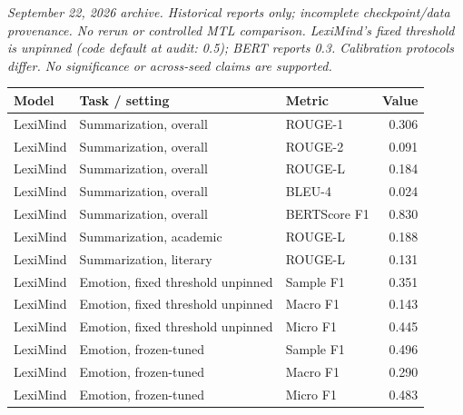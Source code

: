 \noindent\textit{September 22, 2026 archive. Historical reports only; incomplete checkpoint/data provenance. No rerun or controlled MTL comparison. LexiMind's fixed threshold is unpinned (code default at audit: 0.5); BERT reports 0.3. Calibration protocols differ. No significance or across-seed claims are supported.}\par
\begin{longtable}{p{2.4cm}p{4.5cm}p{2.3cm}r}
Model & Task / setting & Metric & Value \\
\hline
LexiMind & Summarization, overall & ROUGE-1 & 0.306 \\
LexiMind & Summarization, overall & ROUGE-2 & 0.091 \\
LexiMind & Summarization, overall & ROUGE-L & 0.184 \\
LexiMind & Summarization, overall & BLEU-4 & 0.024 \\
LexiMind & Summarization, overall & BERTScore F1 & 0.830 \\
LexiMind & Summarization, academic & ROUGE-L & 0.188 \\
LexiMind & Summarization, literary & ROUGE-L & 0.131 \\
LexiMind & Emotion, fixed threshold unpinned & Sample F1 & 0.351 \\
LexiMind & Emotion, fixed threshold unpinned & Macro F1 & 0.143 \\
LexiMind & Emotion, fixed threshold unpinned & Micro F1 & 0.445 \\
LexiMind & Emotion, frozen-tuned & Sample F1 & 0.496 \\
LexiMind & Emotion, frozen-tuned & Macro F1 & 0.290 \\
LexiMind & Emotion, frozen-tuned & Micro F1 & 0.483 \\

\end{longtable}
